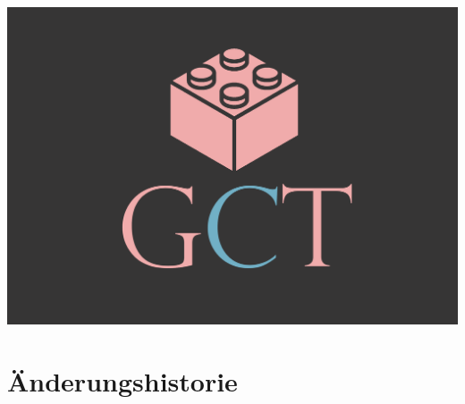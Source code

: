 



\maketitle

\includegraphics[width=18cm]{pictures/cover.png}

\newpage
\section{Änderungshistorie}

